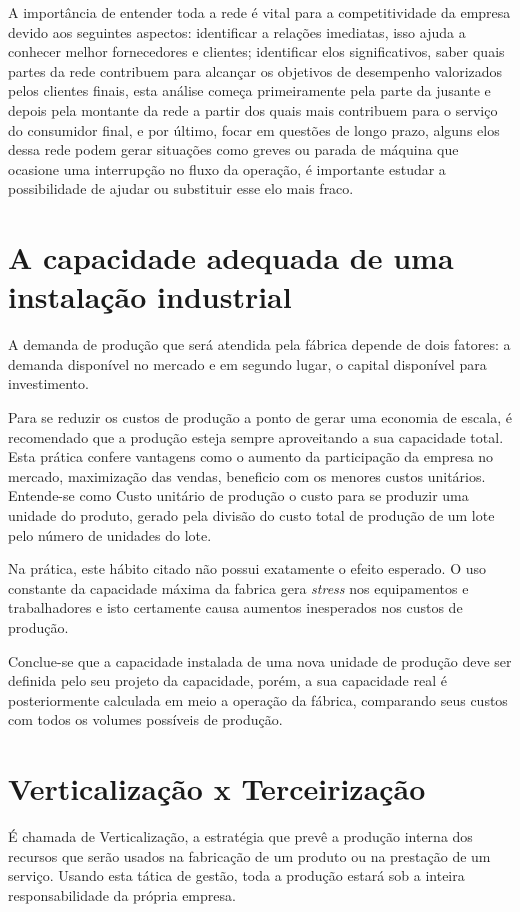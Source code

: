 \par A importância de entender toda a rede é vital para a competitividade da empresa devido aos seguintes aspectos: identificar a relações imediatas, isso ajuda a conhecer melhor fornecedores e clientes; identificar elos significativos, saber quais partes da rede contribuem para alcançar os objetivos de desempenho valorizados pelos clientes finais, esta análise começa primeiramente pela parte da jusante e depois pela montante da rede a partir dos quais mais contribuem para o serviço do consumidor final, e por último, focar em questões de longo prazo, alguns elos dessa rede podem gerar situações como greves ou parada de máquina que ocasione uma interrupção no fluxo da operação, é importante estudar a possibilidade de ajudar ou substituir esse elo mais fraco.

\section{A capacidade adequada de uma instalação industrial}
A demanda de produção que será atendida pela fábrica depende de dois fatores: a demanda disponível no mercado e em segundo lugar, o capital disponível para investimento.

Para se reduzir os custos de produção a ponto de gerar uma economia de escala, é recomendado que a produção esteja sempre aproveitando a sua capacidade total. Esta prática confere vantagens como o aumento da participação da empresa no mercado, maximização das vendas, beneficio com os menores custos unitários. Entende-se como Custo unitário de produção o custo para se produzir uma unidade do produto, gerado pela divisão do custo total de produção de um lote pelo número de unidades do lote.

Na prática, este hábito citado não possui exatamente o efeito esperado. O uso constante da capacidade máxima da fabrica gera \textit{stress} nos equipamentos e trabalhadores e isto certamente causa aumentos inesperados nos custos de produção.

Conclue-se que a capacidade instalada de uma nova unidade de produção deve ser definida pelo seu projeto da capacidade, porém, a sua capacidade real é posteriormente calculada em meio a operação da fábrica, comparando seus custos com todos os volumes possíveis de produção.

\section{Verticalização x Terceirização}
É chamada de Verticalização, a estratégia que prevê a produção interna dos recursos que serão usados na fabricação de um produto ou na prestação de um serviço. Usando esta tática de gestão, toda a produção estará sob a inteira responsabilidade da própria empresa.

